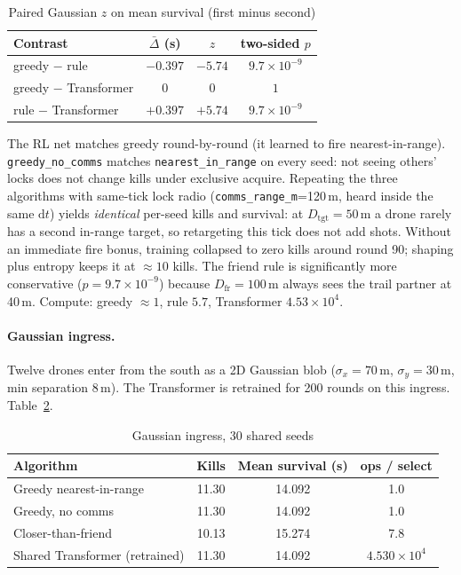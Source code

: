 \documentclass[12pt,a4paper]{article}
\begin{document}
\begin{table}[H]
\centering
\caption{Paired Gaussian $z$ on mean survival (first minus second)}
\label{tab:pval}
\begin{tabular}{lccc}
\toprule
Contrast & $\bar\Delta$ (s) & $z$ & two-sided $p$ \\
\midrule
greedy $-$ rule & $-0.397$ & $-5.74$ & $9.7\times 10^{-9}$ \\
greedy $-$ Transformer & $0$ & $0$ & $1$ \\
rule $-$ Transformer & $+0.397$ & $+5.74$ & $9.7\times 10^{-9}$ \\
\bottomrule
\end{tabular}
\end{table}

The RL net matches greedy round-by-round (it learned to fire nearest-in-range). \texttt{greedy\_no\_comms} matches \texttt{nearest\_in\_range} on every seed: not seeing others' locks does not change kills under exclusive acquire. Repeating the three algorithms with same-tick lock radio (\texttt{comms\_range\_m}=120\,m, heard inside the same $\mathrm{d}t$) yields \emph{identical} per-seed kills and survival: at $D_{\mathrm{tgt}}=50\,\mathrm{m}$ a drone rarely has a second in-range target, so retargeting this tick does not add shots. Without an immediate fire bonus, training collapsed to zero kills around round 90; shaping plus entropy keeps it at $\approx 10$ kills. The friend rule is significantly more conservative ($p=9.7\times 10^{-9}$) because $D_{\mathrm{fr}}=100\,\mathrm{m}$ always sees the trail partner at 40\,m. Compute: greedy $\approx 1$, rule $5.7$, Transformer $4.53\times 10^4$.

\paragraph{Gaussian ingress.}
Twelve drones enter from the south as a 2D Gaussian blob ($\sigma_x=70\,\mathrm{m}$, $\sigma_y=30\,\mathrm{m}$, min separation 8\,m). The Transformer is retrained for 200 rounds on this ingress. Table~\ref{tab:res-g}.

\begin{table}[H]
\centering
\caption{Gaussian ingress, 30 shared seeds}
\label{tab:res-g}
\begin{tabular}{lccc}
\toprule
Algorithm & Kills & Mean survival (s) & ops / select \\
\midrule
Greedy nearest-in-range & 11.30 & 14.092 & 1.0 \\
Greedy, no comms & 11.30 & 14.092 & 1.0 \\
Closer-than-friend & 10.13 & 15.274 & 7.8 \\
Shared Transformer (retrained) & 11.30 & 14.092 & $4.530\times 10^4$ \\
\bottomrule
\end{tabular}
\end{table}
\end{document}
